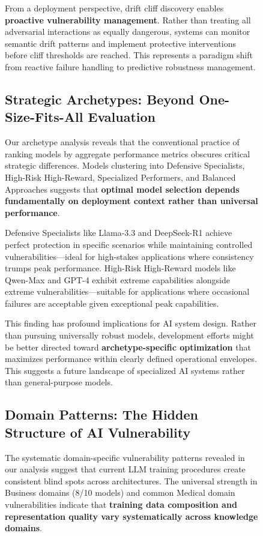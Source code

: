 \documentclass[letterpaper]{article}
\begin{document}
\begin{figure}[ht]
From a deployment perspective, drift cliff discovery enables \textbf{proactive vulnerability management}. Rather than treating all adversarial interactions as equally dangerous, systems can monitor semantic drift patterns and implement protective interventions before cliff thresholds are reached. This represents a paradigm shift from reactive failure handling to predictive robustness management.

\subsection{Strategic Archetypes: Beyond One-Size-Fits-All Evaluation}

Our archetype analysis reveals that the conventional practice of ranking models by aggregate performance metrics obscures critical strategic differences. Models clustering into Defensive Specialists, High-Risk High-Reward, Specialized Performers, and Balanced Approaches suggests that \textbf{optimal model selection depends fundamentally on deployment context rather than universal performance}.

Defensive Specialists like Llama-3.3 and DeepSeek-R1 achieve perfect protection in specific scenarios while maintaining controlled vulnerabilities—ideal for high-stakes applications where consistency trumps peak performance. High-Risk High-Reward models like Qwen-Max and GPT-4 exhibit extreme capabilities alongside extreme vulnerabilities—suitable for applications where occasional failures are acceptable given exceptional peak capabilities.

This finding has profound implications for AI system design. Rather than pursuing universally robust models, development efforts might be better directed toward \textbf{archetype-specific optimization} that maximizes performance within clearly defined operational envelopes. This suggests a future landscape of specialized AI systems rather than general-purpose models.

\subsection{Domain Patterns: The Hidden Structure of AI Vulnerability}

The systematic domain-specific vulnerability patterns revealed in our analysis suggest that current LLM training procedures create consistent blind spots across architectures. The universal strength in Business domains (8/10 models) and common Medical domain vulnerabilities indicate that \textbf{training data composition and representation quality vary systematically across knowledge domains}.


\end{figure}
\end{document}

